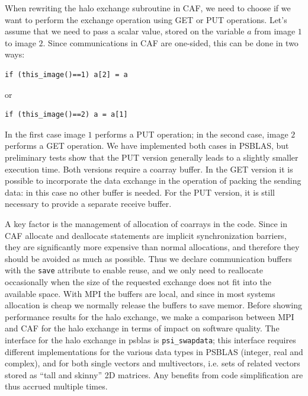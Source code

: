 \documentclass{IOS-Book-Article}
\begin{document}
When rewriting the halo exchange subroutine in CAF, we need to choose
if we want to perform the exchange operation using GET or PUT
operations.  
Let's assume that we need to pass a scalar value, stored on the
variable $a$ from image $1$ to image $2$. Since communications in CAF
are one-sided, this can be done in two ways: 
\lstset{language=Fortran} 
{\small
\begin{lstlisting}
if (this_image()==1) a[2] = a
\end{lstlisting}}
or
{\small
\begin{lstlisting}
if (this_image()==2) a = a[1]
\end{lstlisting}}
In the first case image $1$ performs a PUT operation; in the second
case, image $2$ performs a GET operation. We have implemented both
cases in PSBLAS, but preliminary tests  show that the PUT version
generally leads to a slightly smaller execution time.
Both versions require a coarray buffer. In the GET version it is
possible to incorporate the data exchange in the operation of packing
the sending data: in this case no other buffer is needed. For the PUT
version, it is still necessary to provide a separate receive buffer.

A key factor is the management of  allocation of coarrays in the
code. Since in CAF allocate and deallocate statements are implicit
synchronization barriers, they are significantly more expensive than
normal allocations, and therefore  they should be
avoided as much as possible.  Thus we declare communication
buffers with the \verb|save| attribute to enable reuse, and we only
need to reallocate occasionally when the size of the requested
exchange does not fit into the available space. 
 With MPI the buffers are local, and since in most systems allocation
 is cheap we normally release the buffers to save memor.
Before showing performance results for  the halo exchange, we 
make a comparison between MPI and CAF for the halo exchange in terms
of impact on software quality.  
The interface for the halo exchange in psblas is \verb|psi_swapdata|;
this interface requires different implementations for the various data
types  in PSBLAS (integer, real and complex), and  for both single
vectors and multivectors, i.e. sets of related vectors stored as
``tall and skinny'' 2D matrices. Any benefits from code simplification
are thus accrued multiple times.
\end{document}
